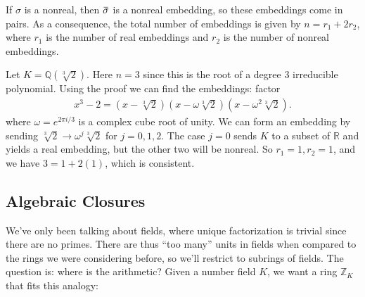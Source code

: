 \begin{remark}

If \(\sigma\) is a nonreal, then
\(\mkern 1.5mu\overline{\mkern-1.5mu\sigma\mkern-1.5mu}\mkern 1.5mu\) is
a nonreal embedding, so these embeddings come in pairs. As a
consequence, the total number of embeddings is given by
\(n = r_1 + 2r_2\), where \(r_1\) is the number of real embeddings and
\(r_2\) is the number of nonreal embeddings.

\end{remark}

\begin{example}

Let \(K = {\mathbb{Q}}(\sqrt[3]{2})\). Here \(n=3\) since this is the
root of a degree 3 irreducible polynomial. Using the proof we can find
the embeddings: factor
\begin{align*}
x^3 - 2 = (x - \sqrt[3]{2})(x - \omega \sqrt[3]{2}) (x - \omega^2 \sqrt[3]{2})
.\end{align*}
where \(\omega = e^{2\pi i / 3}\) is a complex cube root of unity. We
can form an embedding by sending
\(\sqrt[3]{2} \to \omega^j \sqrt[3]{2}\) for \(j=0,1,2\). The case
\(j=0\) sends \(K\) to a subset of \({\mathbb{R}}\) and yields a real
embedding, but the other two will be nonreal. So \(r_1 = 1, r_2 = 1\),
and we have \(3 = 1 + 2(1)\), which is consistent.

\end{example}

\hypertarget{algebraic-closures}{%
\subsection{Algebraic Closures}\label{algebraic-closures}}

\begin{remark}

We've only been talking about fields, where unique factorization is
trivial since there are no primes. There are thus ``too many'' units in
fields when compared to the rings we were considering before, so we'll
restrict to subrings of fields. The question is: where is the
arithmetic? Given a number field \(K\), we want a ring
\({\mathbb{Z}}_K\) that fits this analogy:

\begin{center}
\end{center}

\end{remark}

